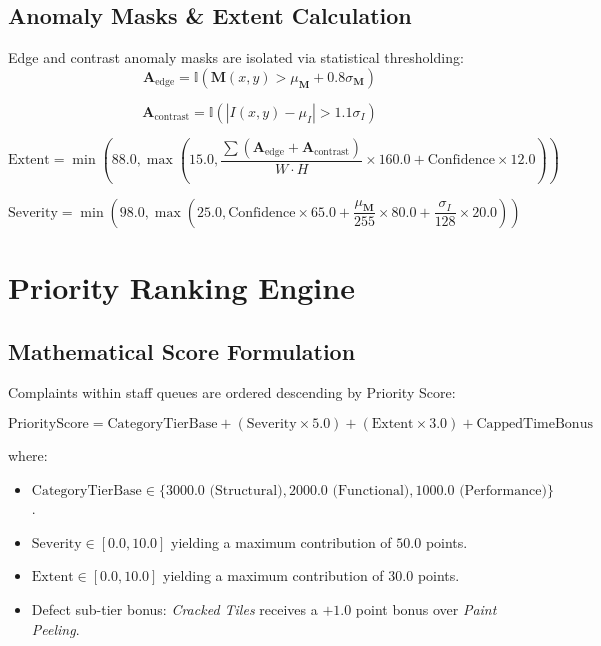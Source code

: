 \documentclass[11pt,a4paper]{article}
\begin{document}
\subsection{Anomaly Masks \& Extent Calculation}
Edge and contrast anomaly masks are isolated via statistical thresholding:
\begin{equation}
\mathbf{A}_{\text{edge}} = \mathbb{I}\left(\mathbf{M}(x, y) > \mu_{\mathbf{M}} + 0.8 \sigma_{\mathbf{M}}\right)
\end{equation}

\begin{equation}
\mathbf{A}_{\text{contrast}} = \mathbb{I}\left(|I(x, y) - \mu_I| > 1.1 \sigma_I\right)
\end{equation}

\begin{equation}
\text{Extent} = \min\left(88.0, \max\left(15.0, \frac{\sum (\mathbf{A}_{\text{edge}} + \mathbf{A}_{\text{contrast}})}{W \cdot H} \times 160.0 + \text{Confidence} \times 12.0\right)\right)
\end{equation}

\begin{equation}
\text{Severity} = \min\left(98.0, \max\left(25.0, \text{Confidence} \times 65.0 + \frac{\mu_{\mathbf{M}}}{255} \times 80.0 + \frac{\sigma_I}{128} \times 20.0\right)\right)
\end{equation}

\section{Priority Ranking Engine}

\subsection{Mathematical Score Formulation}
Complaints within staff queues are ordered descending by Priority Score:

\begin{equation}
\text{PriorityScore} = \text{CategoryTierBase} + (\text{Severity} \times 5.0) + (\text{Extent} \times 3.0) + \text{CappedTimeBonus}
\end{equation}

where:
\begin{itemize}
    \item $\text{CategoryTierBase} \in \{3000.0 \text{ (Structural)}, 2000.0 \text{ (Functional)}, 1000.0 \text{ (Performance)}\}$.
    \item $\text{Severity} \in [0.0, 10.0]$ yielding a maximum contribution of $50.0$ points.
    \item $\text{Extent} \in [0.0, 10.0]$ yielding a maximum contribution of $30.0$ points.
    \item Defect sub-tier bonus: \textit{Cracked Tiles} receives a $+1.0$ point bonus over \textit{Paint Peeling}.
\end{itemize}
\end{document}
